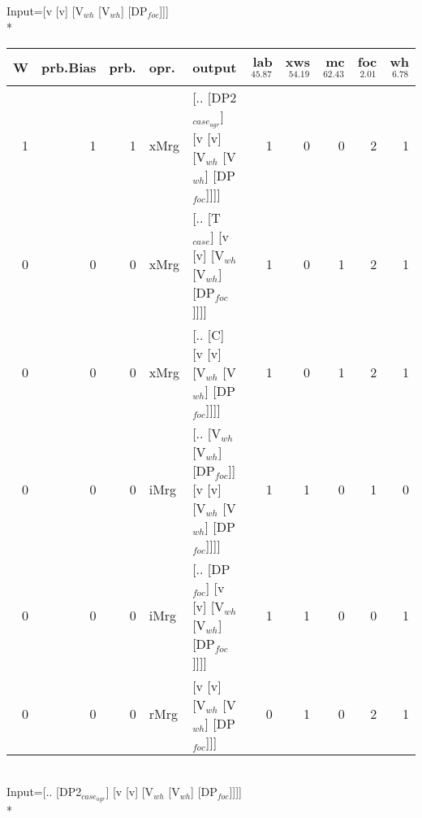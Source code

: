 \begingroup\scriptsize Input=[v [v] [V$_{wh}$ [V$_{wh}$] [DP$_{foc}$]]]\\*
\begin{tabularx}{\linewidth}{rrrlXrrrrr}
\hline
   W &   prb.Bias &   prb. & opr.   & output                                                     &   lab$^{45.87}$ &   xws$^{54.19}$ &   mc$^{62.43}$ &   foc$^{2.01}$ &   wh$^{6.78}$ \\
\hline
   1 &       1 &   1 & xMrg & [.. [DP2$_{case_{agr}}$] [v [v] [V$_{wh}$ [V$_{wh}$] [DP$_{foc}$]]]]         &             1 &             0 &            0 &          2 &        1 \\
   0 &       0 &   0 & xMrg & [.. [T$_{case}$] [v [v] [V$_{wh}$ [V$_{wh}$] [DP$_{foc}$]]]]               &             1 &             0 &            1 &          2 &        1 \\
   0 &       0 &   0 & xMrg & [.. [C] [v [v] [V$_{wh}$ [V$_{wh}$] [DP$_{foc}$]]]]                    &             1 &             0 &            1 &          2 &        1 \\
   0 &       0 &   0 & iMrg & [.. [V$_{wh}$ [V$_{wh}$] [DP$_{foc}$]] [v [v] [V$_{wh}$ [V$_{wh}$] [DP$_{foc}$]]]] &             1 &             1 &            0 &          1 &        0 \\
   0 &       0 &   0 & iMrg & [.. [DP$_{foc}$] [v [v] [V$_{wh}$ [V$_{wh}$] [DP$_{foc}$]]]]               &             1 &             1 &            0 &          0 &        1 \\
   0 &       0 &   0 & rMrg & [v [v] [V$_{wh}$ [V$_{wh}$] [DP$_{foc}$]]]                             &             0 &             1 &            0 &          2 &        1 \\
\hline
\end{tabularx}\endgroup\\
\begingroup\scriptsize Input=[.. [DP2$_{case_{agr}}$] [v [v] [V$_{wh}$ [V$_{wh}$] [DP$_{foc}$]]]]\\*
